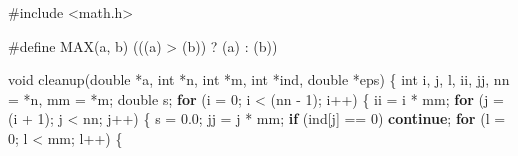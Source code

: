 \documentclass[
  12pt,
  letterpaper,
  DIV=11,
  numbers=noendperiod]{scrreprt}
\newenvironment{Shaded}{\begin{snugshade}}{\end{snugshade}}
\newcommand{\ControlFlowTok}[1]{\textcolor[rgb]{0.00,0.23,0.31}{\textbf{#1}}}
\newcommand{\DataTypeTok}[1]{\textcolor[rgb]{0.68,0.00,0.00}{#1}}
\newcommand{\DecValTok}[1]{\textcolor[rgb]{0.68,0.00,0.00}{#1}}
\newcommand{\FloatTok}[1]{\textcolor[rgb]{0.68,0.00,0.00}{#1}}
\newcommand{\ImportTok}[1]{\textcolor[rgb]{0.00,0.46,0.62}{#1}}
\newcommand{\NormalTok}[1]{\textcolor[rgb]{0.00,0.23,0.31}{#1}}
\newcommand{\OperatorTok}[1]{\textcolor[rgb]{0.37,0.37,0.37}{#1}}
\newcommand{\PreprocessorTok}[1]{\textcolor[rgb]{0.68,0.00,0.00}{#1}}
\theoremstyle{remark}
\begin{document}
\begin{Shaded}
\begin{Highlighting}[]
\PreprocessorTok{\#include }\ImportTok{\textless{}math.h\textgreater{}}

\PreprocessorTok{\#define MAX}\OperatorTok{(}\PreprocessorTok{a}\OperatorTok{,}\PreprocessorTok{ b}\OperatorTok{)}\PreprocessorTok{ }\OperatorTok{(((}\PreprocessorTok{a}\OperatorTok{)}\PreprocessorTok{ }\OperatorTok{\textgreater{}}\PreprocessorTok{ }\OperatorTok{(}\PreprocessorTok{b}\OperatorTok{))}\PreprocessorTok{ }\OperatorTok{?}\PreprocessorTok{ }\OperatorTok{(}\PreprocessorTok{a}\OperatorTok{)}\PreprocessorTok{ }\OperatorTok{:}\PreprocessorTok{ }\OperatorTok{(}\PreprocessorTok{b}\OperatorTok{))}

\DataTypeTok{void}\NormalTok{ cleanup}\OperatorTok{(}\DataTypeTok{double} \OperatorTok{*}\NormalTok{a}\OperatorTok{,} \DataTypeTok{int} \OperatorTok{*}\NormalTok{n}\OperatorTok{,} \DataTypeTok{int} \OperatorTok{*}\NormalTok{m}\OperatorTok{,} \DataTypeTok{int} \OperatorTok{*}\NormalTok{ind}\OperatorTok{,} \DataTypeTok{double} \OperatorTok{*}\NormalTok{eps}\OperatorTok{)} \OperatorTok{\{}
    \DataTypeTok{int}\NormalTok{ i}\OperatorTok{,}\NormalTok{ j}\OperatorTok{,}\NormalTok{ l}\OperatorTok{,}\NormalTok{ ii}\OperatorTok{,}\NormalTok{ jj}\OperatorTok{,}\NormalTok{ nn }\OperatorTok{=} \OperatorTok{*}\NormalTok{n}\OperatorTok{,}\NormalTok{ mm }\OperatorTok{=} \OperatorTok{*}\NormalTok{m}\OperatorTok{;}
    \DataTypeTok{double}\NormalTok{ s}\OperatorTok{;}
    \ControlFlowTok{for} \OperatorTok{(}\NormalTok{i }\OperatorTok{=} \DecValTok{0}\OperatorTok{;}\NormalTok{ i }\OperatorTok{\textless{}} \OperatorTok{(}\NormalTok{nn }\OperatorTok{{-}} \DecValTok{1}\OperatorTok{);}\NormalTok{ i}\OperatorTok{++)} \OperatorTok{\{}
\NormalTok{        ii }\OperatorTok{=}\NormalTok{ i }\OperatorTok{*}\NormalTok{ mm}\OperatorTok{;}
        \ControlFlowTok{for} \OperatorTok{(}\NormalTok{j }\OperatorTok{=} \OperatorTok{(}\NormalTok{i }\OperatorTok{+} \DecValTok{1}\OperatorTok{);}\NormalTok{ j }\OperatorTok{\textless{}}\NormalTok{ nn}\OperatorTok{;}\NormalTok{ j}\OperatorTok{++)} \OperatorTok{\{}
\NormalTok{            s }\OperatorTok{=} \FloatTok{0.0}\OperatorTok{;}
\NormalTok{            jj }\OperatorTok{=}\NormalTok{ j }\OperatorTok{*}\NormalTok{ mm}\OperatorTok{;}
            \ControlFlowTok{if} \OperatorTok{(}\NormalTok{ind}\OperatorTok{[}\NormalTok{j}\OperatorTok{]} \OperatorTok{==} \DecValTok{0}\OperatorTok{)} \ControlFlowTok{continue}\OperatorTok{;}
            \ControlFlowTok{for} \OperatorTok{(}\NormalTok{l }\OperatorTok{=} \DecValTok{0}\OperatorTok{;}\NormalTok{ l }\OperatorTok{\textless{}}\NormalTok{ mm}\OperatorTok{;}\NormalTok{ l}\OperatorTok{++)} \OperatorTok{\{}

\end{Highlighting}
\end{Shaded}
\end{document}
